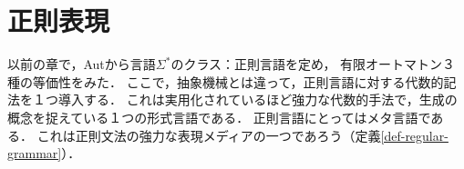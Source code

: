 \documentclass[uplatex, dvipdfmx]{jsreport}
\begin{document}
\section{正則表現}

\begin{tcolorbox}[colframe=ForestGreen, colback=ForestGreen!10!white, breakable,
    title=正則言語hack：適宜適切な代数的手法で有限生成して正則言語を得る代数的表現]
    以前の章で，Autから言語$\Sigma^*$のクラス：正則言語を定め，
    有限オートマトン３種の等価性をみた．
    ここで，抽象機械とは違って，正則言語に対する代数的記法を１つ導入する．
    これは実用化されているほど強力な代数的手法で，生成の概念を捉えている１つの形式言語である．
    正則言語にとってはメタ言語である．
    これは正則文法の強力な表現メディアの一つであろう（定義\ref{def-regular-grammar}）．
\end{tcolorbox}
\end{document}
